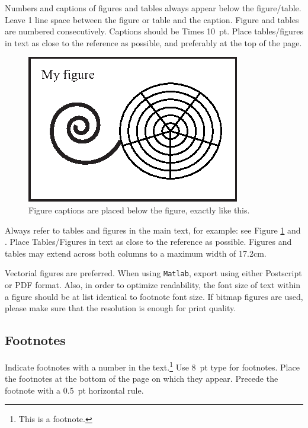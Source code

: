 \documentclass{article}
\begin{document}
Numbers and captions of figures and tables always appear below the figure/table. Leave 1 line space between the figure or table and the caption. Figure and tables are numbered consecutively. Captions should be Times 10~pt. Place tables/figures in text as close to the reference as possible, and preferably at the top of the page.

\begin{figure}[h]
\centering
\includegraphics[width=0.9\columnwidth]{figure.eps}
\caption{Figure captions are placed below the figure, exactly like this.\label{fig:example}}
\end{figure}

Always refer to tables and figures in the main text, for example:
see Figure \ref{fig:example} and . 
Place Tables/Figures in text as close to the reference as possible.
Figures and tables may extend across both columns to a maximum width of 17.2cm.

Vectorial figures are preferred. 
When using {\texttt{Matlab}}, 
export using either Postscript or PDF format. 
Also, in order to optimize readability, the font size of text within a figure should be at list identical to footnote font size. If bitmap figures are used, please make sure that the resolution is enough for print quality. 

\subsection{Footnotes}
Indicate footnotes with a number in the text.\footnote{This is a footnote.}
Use 8~pt type for footnotes. Place the footnotes at the bottom of the page 
on which they appear. 
Precede the footnote with a 0.5~pt horizontal rule.
\end{document}

